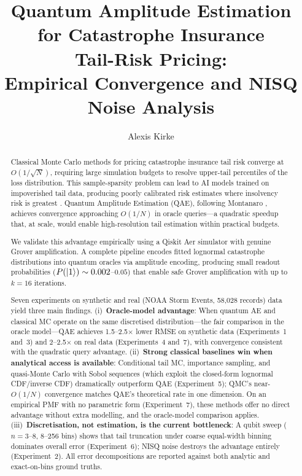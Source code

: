\documentclass[11pt,a4paper]{article}
\title{Quantum Amplitude Estimation for Catastrophe Insurance\\
Tail-Risk Pricing:\\
Empirical Convergence and NISQ Noise Analysis}
\author{Alexis Kirke}
\date{}
\begin{document}
\maketitle


\begin{abstract}
Classical Monte Carlo methods for pricing catastrophe insurance tail risk converge at $O(1/\sqrt{N})$, requiring large simulation budgets to resolve upper-tail percentiles of the loss distribution. This sample-sparsity problem can lead to AI models trained on impoverished tail data, producing poorly calibrated risk estimates where insolvency risk is greatest \cite{Embrechts1997}. Quantum Amplitude Estimation (QAE), following Montanaro \cite{Montanaro2015}, achieves convergence approaching $O(1/N)$ in oracle queries---a quadratic speedup that, at scale, would enable high-resolution tail estimation within practical budgets.

We validate this advantage empirically using a Qiskit Aer simulator with genuine Grover amplification. A complete pipeline encodes fitted lognormal catastrophe distributions into quantum oracles via amplitude encoding, producing small readout probabilities ($P(\ket{1}) \sim 0.002$--$0.05$) that enable safe Grover amplification with up to $k = 16$ iterations.

Seven experiments on synthetic and real (NOAA Storm Events, 58,028 records) data yield three main findings. (i)~\textbf{Oracle-model advantage}: When quantum AE and classical MC operate on the same discretised distribution---the fair comparison in the oracle model---QAE achieves 1.5--2.5$\times$ lower RMSE on synthetic data (Experiments~1 and~3) and 2--2.5$\times$ on real data (Experiments~4 and~7), with convergence consistent with the quadratic query advantage. (ii)~\textbf{Strong classical baselines win when analytical access is available}: Conditional tail MC, importance sampling, and quasi-Monte Carlo with Sobol sequences (which exploit the closed-form lognormal CDF/inverse CDF) dramatically outperform QAE (Experiment~5); QMC's near-$O(1/N)$ convergence matches QAE's theoretical rate in one dimension. On an empirical PMF with no parametric form (Experiment~7), these methods offer no direct advantage without extra modelling, and the oracle-model comparison applies. (iii)~\textbf{Discretisation, not estimation, is the current bottleneck}: A qubit sweep ($n = 3$--$8$, 8--256 bins) shows that tail truncation under coarse equal-width binning dominates overall error (Experiment~6); NISQ noise destroys the advantage entirely (Experiment~2). All error decompositions are reported against both analytic and exact-on-bins ground truths.
\end{abstract}
\end{document}
